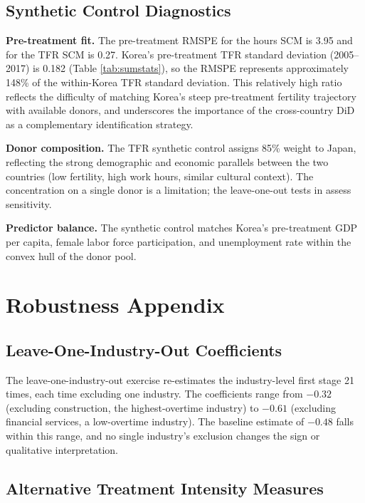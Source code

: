 \documentclass[12pt]{article}
\begin{document}
\subsection{Synthetic Control Diagnostics}

\textbf{Pre-treatment fit.} The pre-treatment RMSPE for the hours SCM is 3.95 and for the TFR SCM is 0.27. Korea's pre-treatment TFR standard deviation (2005--2017) is 0.182 (Table \ref{tab:sumstats}), so the RMSPE represents approximately 148\% of the within-Korea TFR standard deviation. This relatively high ratio reflects the difficulty of matching Korea's steep pre-treatment fertility trajectory with available donors, and underscores the importance of the cross-country DiD as a complementary identification strategy.

\textbf{Donor composition.} The TFR synthetic control assigns 85\% weight to Japan, reflecting the strong demographic and economic parallels between the two countries (low fertility, high work hours, similar cultural context). The concentration on a single donor is a limitation; the leave-one-out tests in  assess sensitivity.

\textbf{Predictor balance.} The synthetic control matches Korea's pre-treatment GDP per capita, female labor force participation, and unemployment rate within the convex hull of the donor pool.


\section{Robustness Appendix}
\label{sec:rob_appendix}

\subsection{Leave-One-Industry-Out Coefficients}

The leave-one-industry-out exercise re-estimates the industry-level first stage 21 times, each time excluding one industry. The coefficients range from $-0.32$ (excluding construction, the highest-overtime industry) to $-0.61$ (excluding financial services, a low-overtime industry). The baseline estimate of $-0.48$ falls within this range, and no single industry's exclusion changes the sign or qualitative interpretation.

\subsection{Alternative Treatment Intensity Measures}
\end{document}
